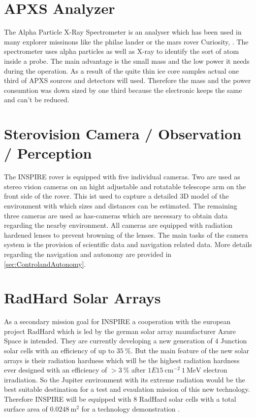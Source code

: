 \section{APXS Analyzer}
The Alpha Particle X-Ray Spectrometer is an analyser which has been used in many explorer missinons like the philae lander or the mars rover Curiosity, \cite{ref_pay_1} \cite{ref_pay_2}.
The spectrometer uses alpha particles as well as X-ray to identify the sort of atom inside a probe.
The main advantage is the small mass and the  low power it needs during the operation.
As a result of the  quite thin ice core samples actual one third of APXS sources and detectors will used.
Therefore the mass and the power consumtion was down sized by one third because the electronic keeps the same and can't be reduced.


\section{Sterovision Camera / Observation / Perception}

The INSPIRE rover is equipped with five individual cameras. Two are used as stereo vision cameras on an hight adjustable and rotatable telescope arm on the front side of the rover. This ist used to capture a detailed 3D model of the environment with which sizes and distances can be estimated. The remaining three cameras are used as has-cameras which are necessary to obtain data regarding the nearby environment. All cameras are equipped with radiation hardened lenses to prevent browning of the lenses. The main tasks of the camera system is the provision of scientific data and navigation related data. More details regarding the navigation and autonomy are provided in \autoref{sec:ControlandAutonomy}.

\section{RadHard Solar Arrays}
\label{subsec:radhard}
As a secondary mission goal for INSPIRE a cooperation with the european project RadHard which is led by the german solar array manufacturer Azure Space is intended. They are currently developing a new generation of $4$ Junction solar cells with an efficiency of up to $35~\% $. But the main feature of the new solar arrays is their radiation hardness which will be the highest radiation hardness ever designed with an efficiency of $>3~\% $ after $1E15~\text{cm}^{-2} \ 1~\text{MeV}$ electron irradiation. So the Jupiter environment with its extreme radiation would be the best suitable destination for a test and evaulation mission of this new technology. Therefore INSPIRE will be equipped with $8$ RadHard solar cells with a total surface area of $0.0248~\text{m}^2$ for a technology demonstration \cite{FraunhoferInstituteforSolarEnergySystemsISE.2021}.

